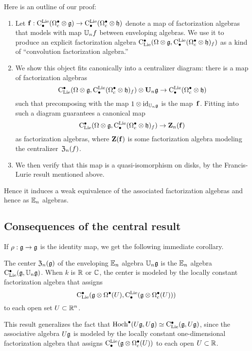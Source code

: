 \documentclass[11pt]{amsart}
\numberwithin{equation}{section}
\begin{document}
Here is an outline of our proof:
\begin{enumerate}
\item Let ${\bf f}: {\rm C}^{\rm Lie}_\bullet(\Omega_c^\bullet \otimes \mathfrak g) \to {\rm C}^{\rm Lie}_\bullet(\Omega_c^\bullet \otimes \mathfrak h)$ denote a map of factorization algebras that models with map $\mathbb U_n f$ between enveloping algebras. 
We use it to produce an explicit factorization algebra ${\rm C}_{\rm Lie}^\bullet(\Omega \otimes \mathfrak g, {\rm C}^{\rm Lie}_\bullet(\Omega_c^\bullet \otimes \mathfrak h)_f)$ as a kind of ``convolution factorization algebra.'' 
\item We show this object fits canonically into a centralizer diagram: there is a map of factorization algebras
\[
{\rm C}_{\rm Lie}^\bullet(\Omega \otimes \mathfrak g, {\rm C}^{\rm Lie}_\bullet(\Omega_c^\bullet \otimes \mathfrak h)_f) \otimes \mathbf U_n \mathfrak g \to {\rm C}^{\rm Lie}_\bullet(\Omega_c^\bullet \otimes \mathfrak h)
\]
such that precomposing with the map $1 \otimes {\rm id}_{\mathbb U_n \mathfrak g}$ is the map~${\bf f}$.
Fitting into such a diagram guarantees a canonical map 
\[
{\rm C}_{\rm Lie}^\bullet(\Omega \otimes \mathfrak g, {\rm C}^{\rm Lie}_\bullet(\Omega_c^\bullet \otimes \mathfrak h)_f) \to \mathbf Z_n({\bf f})
\]
as factorization algebras, where $\mathbf Z({\bf f})$ is some factorization algebra modeling the centralizer~${\frak Z}_n(f)$. 
\item We then verify that this map is a quasi-isomorphism on disks, by the Francis-Lurie result mentioned above. 
\end{enumerate}
Hence it induces a weak equivalence of the associated factorization algebras and hence as $\mathbb E_n$ algebras. 

\subsection{Consequences of the central result}

If $\rho: \mathfrak g \to \mathfrak g$ is the identity map, we get the following immediate corollary.

\begin{cor}
\label{thm: center}
The center ${\frak Z}_n(\mathfrak g)$ of the enveloping $\mathbb E_n$ algebra $\mathbb U_n\mathfrak g$ is the $\mathbb E_n$ algebra ${\rm C}_{\rm Lie}^\bullet(\mathfrak g, \mathbb U_n\mathfrak g)$. 
When $k$ is $\mathbb R$ or $\mathbb C$, the 
center is modeled by the locally constant factorization algebra that assigns
\[
{\rm C}_{\rm Lie}^\bullet(\mathfrak g \otimes \Omega^\bullet(U), {\rm C}^{\rm Lie}_\bullet( \mathfrak g \otimes \Omega^\bullet_c(U)))
\]
to each open set $U \subset \mathbb R^n$.
\end{cor}

This result generalizes the fact that ${\rm Hoch}^\bullet(U\mathfrak g,U\mathfrak g) \simeq {\rm C}_{\rm Lie}^\bullet(\mathfrak g, U\mathfrak g)$, 
since the associative algebra $U\mathfrak g$ is modeled by the locally constant one-dimensional factorization algebra that assigns
${\rm C}^{\rm Lie}_\bullet (\mathfrak g \otimes \Omega^\bullet_c(U))$ to each open $U \subset \mathbb R$. 
\end{document}
